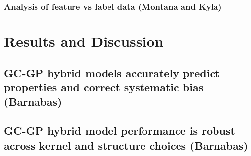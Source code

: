 \documentclass[journal=jacsat,manuscript=article]{achemso}
\begin{document}
\subsubsection{Analysis of feature vs label data (Montana and Kyla) }


\section{Results and Discussion}

\subsection{GC-GP hybrid models accurately predict properties and correct systematic bias (Barnabas)}

\subsection{GC-GP hybrid model performance is robust across kernel and structure choices (Barnabas) }


%
\end{document}
